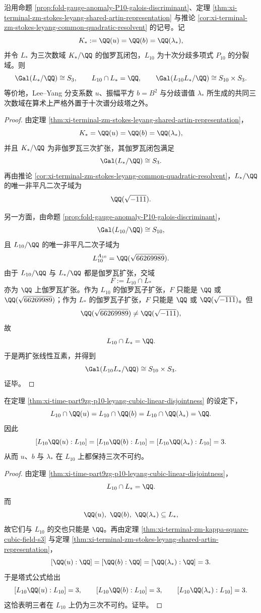\begin{theorem}\label{thm:xi-time-part9zg-p10-leyang-cubic-linear-disjointness}
沿用命题 \ref{prop:fold-gauge-anomaly-P10-galois-discriminant}、定理 \ref{thm:xi-terminal-zm-stokes-leyang-shared-artin-representation} 与推论 \ref{cor:xi-terminal-zm-stokes-leyang-common-quadratic-resolvent} 的记号。记
\[
K_*:=\QQ(u)=\QQ(b)=\QQ(\lambda_*),
\]
并令 \(L_*\) 为三次数域 \(K_*/\QQ\) 的伽罗瓦闭包，\(L_{10}\) 为十次分歧多项式 \(P_{10}\) 的分裂域。则
\[
\Gal(L_*/\QQ)\cong S_3,
\qquad
L_{10}\cap L_*=\QQ,
\qquad
\Gal(L_{10}L_*/\QQ)\cong S_{10}\times S_3.
\]
等价地，Lee--Yang 分支系数 \(u\)、振幅平方 \(b=B^2\) 与分歧谱值 \(\lambda_*\) 所生成的共同三次数域在算术上严格外置于十次谱分歧塔之外。
\end{theorem}
\begin{proof}
由定理 \ref{thm:xi-terminal-zm-stokes-leyang-shared-artin-representation}，
\[
K_*=\QQ(u)=\QQ(b)=\QQ(\lambda_*),
\]
并且 \(K_*/\QQ\) 为非伽罗瓦三次扩张，其伽罗瓦闭包满足
\[
\Gal(L_*/\QQ)\cong S_3.
\]
再由推论 \ref{cor:xi-terminal-zm-stokes-leyang-common-quadratic-resolvent}，\(L_*/\QQ\) 的唯一非平凡二次子域为
\[
\QQ(\sqrt{-111}).
\]

另一方面，由命题 \ref{prop:fold-gauge-anomaly-P10-galois-discriminant}，
\[
\Gal(L_{10}/\QQ)\cong S_{10},
\]
且 \(L_{10}/\QQ\) 的唯一非平凡二次子域为
\[
L_{10}^{A_{10}}=\QQ(\sqrt{66269989}).
\]
由于 \(L_{10}/\QQ\) 与 \(L_*/\QQ\) 都是伽罗瓦扩张，交域
\[
F:=L_{10}\cap L_*
\]
亦为 \(\QQ\) 上伽罗瓦扩张。作为 \(L_{10}\) 的伽罗瓦子扩张，\(F\) 只能是 \(\QQ\) 或 \(\QQ(\sqrt{66269989})\)；作为 \(L_*\) 的伽罗瓦子扩张，\(F\) 只能是 \(\QQ\) 或 \(\QQ(\sqrt{-111})\)。但
\[
\QQ(\sqrt{66269989})\neq \QQ(\sqrt{-111}),
\]
故
\[
L_{10}\cap L_*=\QQ.
\]
于是两扩张线性互素，并得到
\[
\Gal(L_{10}L_*/\QQ)\cong S_{10}\times S_3.
\]
证毕。
\end{proof}

\begin{corollary}\label{cor:xi-time-part9zg-p10-branch-cubic-irreducibility}
在定理 \ref{thm:xi-time-part9zg-p10-leyang-cubic-linear-disjointness} 的设定下，
\[
L_{10}\cap \QQ(u)=
L_{10}\cap \QQ(b)=
L_{10}\cap \QQ(\lambda_*)=
\QQ.
\]
因此
\[
[L_{10}\QQ(u):L_{10}]
=
[L_{10}\QQ(b):L_{10}]
=
[L_{10}\QQ(\lambda_*):L_{10}]
=3.
\]
从而 \(u\)、\(b\) 与 \(\lambda_*\) 在 \(L_{10}\) 上都保持三次不可约。
\end{corollary}
\begin{proof}
由定理 \ref{thm:xi-time-part9zg-p10-leyang-cubic-linear-disjointness}，
\[
L_{10}\cap L_*=\QQ.
\]
而
\[
\QQ(u),\ \QQ(b),\ \QQ(\lambda_*)\subseteq L_*,
\]
故它们与 \(L_{10}\) 的交也只能是 \(\QQ\)。再由定理 \ref{thm:xi-terminal-zm-kappa-square-cubic-field-s3} 与定理 \ref{thm:xi-terminal-zm-stokes-leyang-shared-artin-representation}，
\[
[\QQ(u):\QQ]=[\QQ(b):\QQ]=[\QQ(\lambda_*):\QQ]=3.
\]
于是塔式公式给出
\[
[L_{10}\QQ(u):L_{10}]=3,
\qquad
[L_{10}\QQ(b):L_{10}]=3,
\qquad
[L_{10}\QQ(\lambda_*):L_{10}]=3.
\]
这恰表明三者在 \(L_{10}\) 上仍为三次不可约。证毕。
\end{proof}


